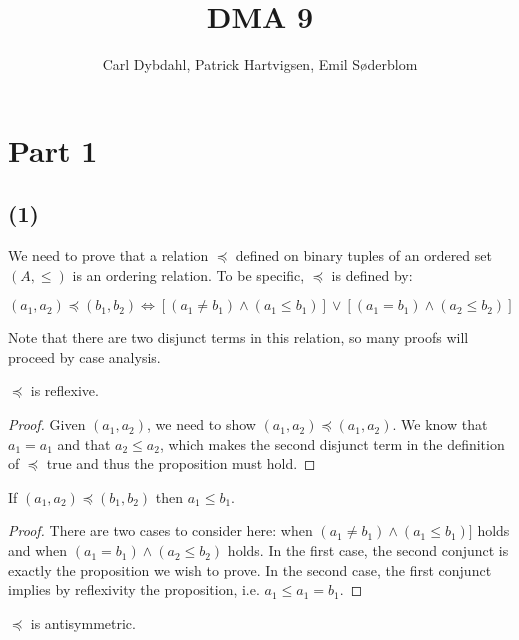 \documentclass[a4paper]{article}
\title{DMA 9}
\author{Carl Dybdahl, Patrick Hartvigsen, Emil Søderblom}
\begin{document}
\maketitle

\section*{Part 1}

\subsection*{(1)}

We need to prove that a relation \(\preceq\) defined on binary tuples of an ordered set \((A, \le)\) is an ordering relation. To be specific, \(\preceq\) is defined by:

\[(a_1, a_2) \preceq (b_1, b_2) \iff [(a_1 \ne b_1) \land (a_1 \le b_1)] \lor [(a_1 = b_1) \land (a_2 \le b_2)]\]

Note that there are two disjunct terms in this relation, so many proofs will proceed by case analysis.

\begin{theorem} \(\preceq\) is reflexive. \end{theorem}

\begin{proof} Given \((a_1, a_2)\), we need to show \((a_1, a_2) \preceq (a_1, a_2)\). We know that \(a_1 = a_1\) and that \(a_2 \le a_2\), which makes the second disjunct term in the definition of \(\preceq\) true and thus the proposition must hold.\end{proof}

\begin{lemma} \label{preceq-impl-le} If \((a_1, a_2) \preceq (b_1, b_2)\) then \(a_1 \le b_1\). \end{lemma}

\begin{proof} There are two cases to consider here: when \((a_1 \ne b_1) \land (a_1 \le b_1)]\) holds and when \((a_1 = b_1) \land (a_2 \le b_2)\) holds. In the first case, the second conjunct is exactly the proposition we wish to prove. In the second case, the first conjunct implies by reflexivity the proposition, i.e. \(a_1 \le a_1 = b_1\). \end{proof}

\begin{theorem} \(\preceq\) is antisymmetric. \end{theorem}
\end{document}
